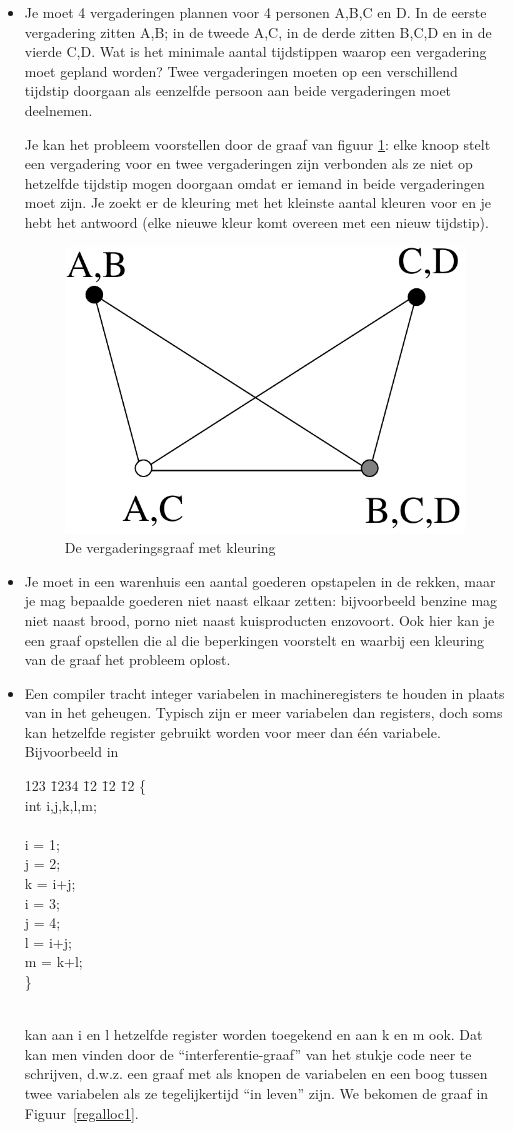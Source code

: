 \begin{itemize}
\item
Je moet 4 vergaderingen plannen voor 4 personen A,B,C en D. In de eerste
vergadering zitten A,B; in de tweede A,C, in de derde zitten
B,C,D
en in
de vierde C,D. Wat is het minimale aantal tijdstippen waarop een
vergadering moet gepland worden? Twee vergaderingen moeten op een
verschillend tijdstip doorgaan als eenzelfde persoon aan beide
vergaderingen moet deelnemen.

Je kan het probleem voorstellen door de graaf van figuur
\ref{planning1}: elke knoop stelt een vergadering voor en twee
vergaderingen zijn verbonden als ze niet op hetzelfde tijdstip mogen
doorgaan omdat er iemand in beide vergaderingen moet zijn. Je zoekt er
de kleuring met het kleinste aantal kleuren voor en je hebt het
antwoord (elke nieuwe kleur komt overeen met een nieuw tijdstip).
\begin{figure}[ht]
\begin{center}
\includegraphics[width=0.2\linewidth,keepaspectratio]{planning1}
\end{center}
\caption{De vergaderingsgraaf met kleuring\label{planning1}}
\end{figure}
\item
Je moet in een warenhuis een aantal goederen opstapelen in de rekken,
maar je mag bepaalde goederen niet naast elkaar zetten: bijvoorbeeld
benzine mag niet naast brood, porno niet naast kuisproducten
enzovoort. Ook hier kan je een graaf opstellen die al die beperkingen
voorstelt en waarbij een kleuring van de graaf het probleem oplost.
\item
Een compiler tracht integer variabelen in machineregisters te
houden in plaats van in het geheugen. Typisch zijn er meer variabelen
dan registers, doch soms kan hetzelfde register gebruikt worden voor
meer dan \'{e}\'{e}n variabele. Bijvoorbeeld in


\parbox{9cm}{
\begin{tabbing}
123 \= 1234 \= 12 \= 12 \= 12 \kill
\> \> \{\\
\> \> \> int i,j,k,l,m;\\
\\
\> \> \> i = 1;\\
\> \> \> j = 2;\\
\> \> \> k = i+j;\\
\> \> \> i = 3;\\
\> \> \> j = 4;\\
\> \> \> l = i+j;\\
\> \> \> m = k+l;\\
\> \> \}
\end{tabbing}
}\\
kan aan i en l hetzelfde register worden toegekend en aan k en m
ook. Dat kan men vinden door de ``interferentie-graaf'' van het stukje
code neer te schrijven, d.w.z. een graaf met als knopen de variabelen
en een boog tussen twee variabelen als ze tegelijkertijd ``in leven''
zijn. We bekomen de graaf in Figuur~\ref{regalloc1}.


\end{itemize}
